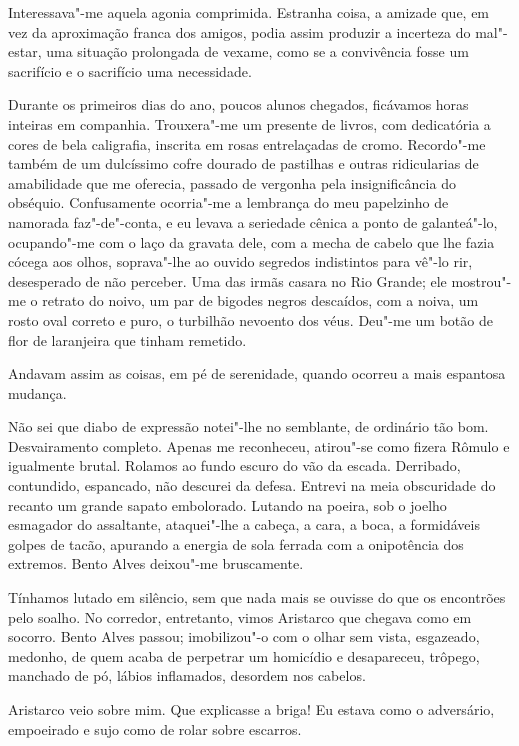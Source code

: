 Interessava"-me aquela agonia
comprimida. Estranha coisa, a amizade que, em vez da aproximação franca
dos amigos, podia assim produzir a incerteza do mal"-estar, uma
situação prolongada de vexame, como se a convivência fosse um
sacrifício e o sacrifício uma necessidade. 

Durante os primeiros dias do
ano, poucos alunos chegados, ficávamos horas inteiras em companhia.
Trouxera"-me um presente de livros, com dedicatória a cores de bela
caligrafia, inscrita em rosas entrelaçadas de cromo. Recordo"-me
também de um dulcíssimo cofre dourado de pastilhas e outras
ridicularias de amabilidade que me oferecia, passado de vergonha pela
insignificância do obséquio. Confusamente ocorria"-me a lembrança do
meu papelzinho de namorada faz"-de"-conta, e eu levava a seriedade
cênica a ponto de galanteá"-lo, ocupando"-me com o laço da gravata
dele, com a mecha de cabelo que lhe fazia cócega aos olhos,
soprava"-lhe ao ouvido segredos indistintos para vê"-lo rir,
desesperado de não perceber. Uma das irmãs casara no Rio Grande; ele
mostrou"-me o retrato do noivo, um par de bigodes negros descaídos,
com a noiva, um rosto oval correto e puro, o turbilhão nevoento dos
véus. Deu"-me um botão de flor de laranjeira que tinham remetido.

Andavam assim as coisas, em pé de serenidade, quando ocorreu a mais
espantosa mudança. 

Não sei que diabo de expressão notei"-lhe no
semblante, de ordinário tão bom. Desvairamento completo. Apenas me
reconheceu, atirou"-se como fizera Rômulo e igualmente brutal. Rolamos
ao fundo escuro do vão da escada. Derribado, contundido, espancado, não
descurei da defesa. Entrevi na meia obscuridade do recanto um grande
sapato embolorado. Lutando na poeira, sob o joelho esmagador do
assaltante, ataquei"-lhe a cabeça, a cara, a boca, a formidáveis
golpes de tacão, apurando a energia de sola ferrada com a onipotência
dos extremos. Bento Alves deixou"-me bruscamente. 

Tínhamos lutado em
silêncio, sem que nada mais se ouvisse do que os encontrões pelo
soalho. No corredor, entretanto, vimos Aristarco que chegava como em
socorro. Bento Alves passou; imobilizou"-o com o olhar sem vista,
esgazeado, medonho, de quem acaba de perpetrar um homicídio e
desapareceu, trôpego, manchado de pó, lábios inflamados, 
desordem nos cabelos. 

Aristarco veio sobre mim. Que explicasse a briga! Eu estava
como o adversário, empoeirado e sujo como de rolar sobre escarros.

